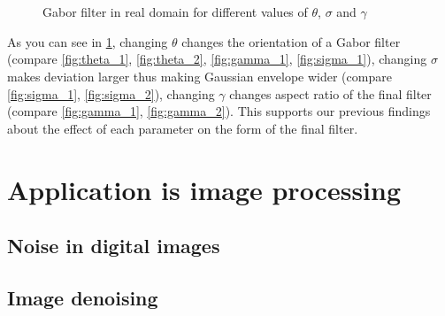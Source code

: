 \documentclass{article}
\begin{document}
\begin{figure}[h]
        \centering
    \caption{Gabor filter in real domain for different values of $\theta$, $\sigma$ and $\gamma$}
    \qquad
    \\
    \qquad
    \\
    \qquad
    \label{fig:gabor}
\end{figure}

As you can see in \cref{fig:gabor}, changing $\theta$ changes the orientation of a Gabor filter (compare \cref{fig:theta_1}, \cref{fig:theta_2}, \cref{fig:gamma_1}, \cref{fig:sigma_1}), changing $\sigma$ makes deviation larger thus making Gaussian envelope wider (compare \cref{fig:sigma_1}, \cref{fig:sigma_2}), changing $\gamma$ changes aspect ratio of the final filter (compare \cref{fig:gamma_1}, \cref{fig:gamma_2}). This supports our previous findings about the effect of each parameter on the form of the final filter.



\section{Application is image processing}

\subsection{Noise in digital images}

\subsection{Image denoising}
\end{document}
